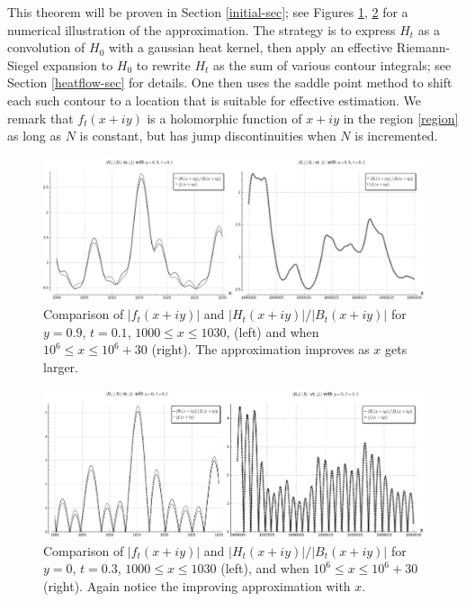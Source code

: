 This theorem will be proven in Section \ref{initial-sec}; see Figures \ref{htft}, \ref{htft-2} for a numerical illustration of the approximation.  The strategy is to express $H_t$ as a convolution of $H_0$ with a gaussian heat kernel, then apply an effective Riemann-Siegel expansion to $H_0$ to rewrite $H_t$ as the sum of various contour integrals; see Section \ref{heatflow-sec} for details.  One then uses the saddle point method to shift each such contour to a location that is suitable for effective estimation.   We remark that $f_t(x+iy)$ is a holomorphic function of $x+iy$ in the region \eqref{region} as long as $N$ is constant, but has jump discontinuities when $N$ is incremented.

\begin{figure}[h!]
  \includegraphics[width=\linewidth]{ft_vs_HtdivBt_y_09.png}
  \caption{Comparison of $|f_t(x+iy)|$ and $|H_t(x+iy)|/|B_t(x+iy)|$ for $y=0.9$, $t=0.1$, $1000 \leq x \leq 1030$, (left) and when $10^6 \leq x \leq 10^6 + 30$ (right). The approximation improves as $x$ gets larger.}
	\label{htft}
\end{figure}

\begin{figure}[h!]
  \includegraphics[width=\linewidth]{ft_vs_HtdivBt_y_0.png}
  \caption{Comparison of $|f_t(x+iy)|$ and $|H_t(x+iy)|/|B_t(x+iy)|$ for $y=0$, $t=0.3$, $1000 \leq x \leq 1030$ (left), and when $10^6 \leq x \leq 10^6 + 30$ (right). Again notice the improving approximation with $x$.}
	\label{htft-2}
\end{figure}

